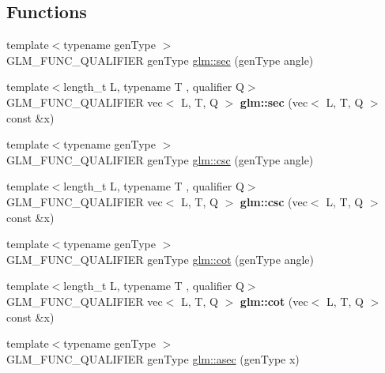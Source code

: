 \subsection*{Functions}
\begin{DoxyCompactItemize}
\item 
{\footnotesize template$<$typename gen\+Type $>$ }\\G\+L\+M\+\_\+\+F\+U\+N\+C\+\_\+\+Q\+U\+A\+L\+I\+F\+I\+ER gen\+Type \hyperlink{group__gtc__reciprocal_gae4bcbebee670c5ea155f0777b3acbd84}{glm\+::sec} (gen\+Type angle)
\item 
\mbox{\label{reciprocal_8inl_af8cfb137d5aad26417489e9109b9cfa8}} 
{\footnotesize template$<$length\+\_\+t L, typename T , qualifier Q$>$ }\\G\+L\+M\+\_\+\+F\+U\+N\+C\+\_\+\+Q\+U\+A\+L\+I\+F\+I\+ER vec$<$ L, T, Q $>$ {\bfseries glm\+::sec} (vec$<$ L, T, Q $>$ const \&x)
\item 
{\footnotesize template$<$typename gen\+Type $>$ }\\G\+L\+M\+\_\+\+F\+U\+N\+C\+\_\+\+Q\+U\+A\+L\+I\+F\+I\+ER gen\+Type \hyperlink{group__gtc__reciprocal_ga59dd0005b6474eea48af743b4f14ebbb}{glm\+::csc} (gen\+Type angle)
\item 
\mbox{\label{reciprocal_8inl_a8640881051524d5180db9d159116f5d9}} 
{\footnotesize template$<$length\+\_\+t L, typename T , qualifier Q$>$ }\\G\+L\+M\+\_\+\+F\+U\+N\+C\+\_\+\+Q\+U\+A\+L\+I\+F\+I\+ER vec$<$ L, T, Q $>$ {\bfseries glm\+::csc} (vec$<$ L, T, Q $>$ const \&x)
\item 
{\footnotesize template$<$typename gen\+Type $>$ }\\G\+L\+M\+\_\+\+F\+U\+N\+C\+\_\+\+Q\+U\+A\+L\+I\+F\+I\+ER gen\+Type \hyperlink{group__gtc__reciprocal_ga3a7b517a95bbd3ad74da3aea87a66314}{glm\+::cot} (gen\+Type angle)
\item 
\mbox{\label{reciprocal_8inl_a6ebba0659ffa9269bf45adf91077789c}} 
{\footnotesize template$<$length\+\_\+t L, typename T , qualifier Q$>$ }\\G\+L\+M\+\_\+\+F\+U\+N\+C\+\_\+\+Q\+U\+A\+L\+I\+F\+I\+ER vec$<$ L, T, Q $>$ {\bfseries glm\+::cot} (vec$<$ L, T, Q $>$ const \&x)
\item 
{\footnotesize template$<$typename gen\+Type $>$ }\\G\+L\+M\+\_\+\+F\+U\+N\+C\+\_\+\+Q\+U\+A\+L\+I\+F\+I\+ER gen\+Type \hyperlink{group__gtc__reciprocal_ga2c5b7f962c2c9ff684e6d2de48db1f10}{glm\+::asec} (gen\+Type x)

\end{DoxyCompactItemize}
